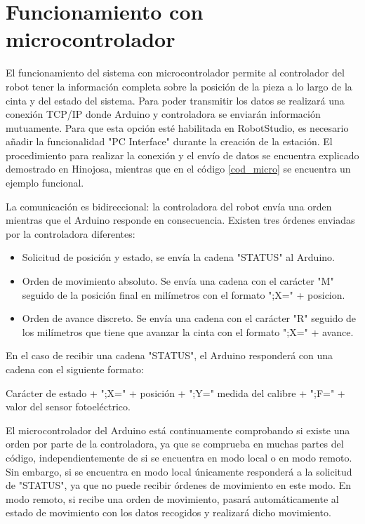 

\section{Funcionamiento con microcontrolador}

El funcionamiento del sistema con microcontrolador permite al controlador del robot tener la información
completa sobre la posición de la pieza a lo largo de la cinta y del estado del sistema. Para poder 
transmitir los datos se realizará una conexión TCP/IP donde Arduino y controladora se enviarán
información mutuamente. Para que esta opción esté habilitada en RobotStudio, es necesario añadir la 
funcionalidad "PC Interface" durante la creación de la estación. El procedimiento para realizar la conexión 
y el envío de datos se encuentra explicado demostrado en Hinojosa\cite{rea}, mientras que en el código 
\ref{cod_micro} se encuentra un ejemplo funcional.

La comunicación es bidireccional: la controladora del robot envía una orden mientras que el Arduino responde
en consecuencia. Existen tres órdenes enviadas por la controladora diferentes:
\begin{itemize}
    \item Solicitud de posición y estado, se envía la cadena "STATUS" al Arduino.
    \item Orden de movimiento absoluto. Se envía una cadena con el carácter "M" seguido de la posición final en 
    milímetros con el formato ";X=" + posicion.
    \item Orden de avance discreto. Se envía una cadena con el carácter "R" seguido de los milímetros que tiene
    que avanzar la cinta con el formato ";X=" + avance.
\end{itemize}

En el caso de recibir una cadena "STATUS", el Arduino responderá con una cadena con el siguiente formato:

Carácter de estado + ";X=" + posición + ";Y=" medida del calibre + ";F=" + valor del sensor fotoeléctrico.

El microcontrolador del Arduino está continuamente comprobando si existe una orden por parte de la controladora,
ya que se comprueba en muchas partes del código, independientemente de si se encuentra en modo local o en modo
remoto. Sin embargo, si se encuentra en modo local únicamente responderá a la solicitud de "STATUS", ya que 
no puede recibir órdenes de movimiento en este modo. En modo remoto, si recibe una orden de movimiento, pasará
automáticamente al estado de movimiento con los datos recogidos y realizará dicho movimiento.

